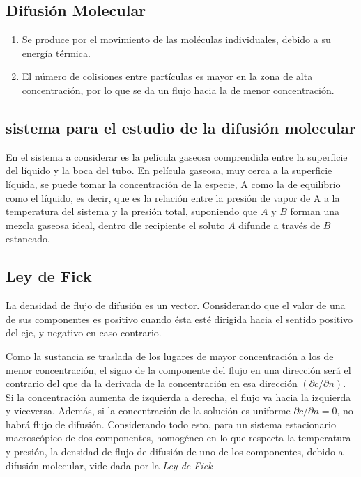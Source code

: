 \subsection{Difusión Molecular}
\begin{enumerate}
    \item Se produce por el movimiento de las moléculas individuales, debido a su energía térmica.
    \item El número de colisiones entre partículas es mayor en la zona de alta concentración, por lo que se da un flujo hacia la de menor concentración.
\end{enumerate}

\subsection{sistema para el estudio de la difusión molecular}
En el sistema a considerar es la película gaseosa comprendida entre la superficie del líquido y la boca
del tubo. En película gaseosa, muy cerca a la superficie líquida, se puede tomar la concentración de la especie, 
A como la de equilibrio como el líquido, es decir, 
que es la relación entre la presión de vapor de A
a la temperatura del sistema y la presión total, suponiendo
que $A$ y $B$ forman una mezcla gaseosa ideal,
dentro dle recipiente el soluto $A$ difunde a través de $B$ estancado.

\subsection{Ley de Fick}
La densidad de flujo de difusión es un vector. Considerando que
el valor de una de sus componentes es positivo cuando ésta esté dirigida
hacia el sentido positivo del eje, y negativo en caso contrario.

Como la sustancia se traslada de los lugares de mayor concentración a los
de menor concentración, el signo de la componente del flujo en una dirección
será el contrario del que da la derivada de la concentración en esa
dirección $(\partial c/ \partial n)$. Si la concentración 
aumenta de izquierda a derecha, el flujo va hacia la izquierda y viceversa.
Además, si la concentración de la solución es uniforme $\partial c / \partial n = 0$,
no habrá flujo de difusión. Considerando todo esto, para
un sistema estacionario macroscópico de dos componentes, homogéneo en lo que
respecta la temperatura y presión, la densidad
de flujo de difusión de uno de los componentes, debido a difusión molecular, 
vide dada por la \textit{Ley de Fick}~\cite{agus:2011}

